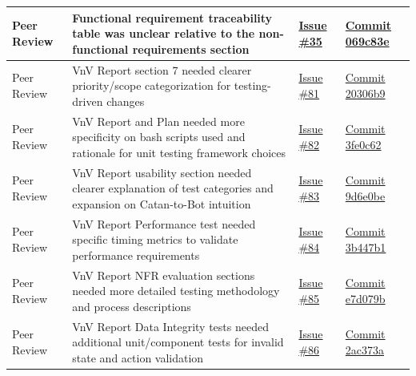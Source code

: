 \documentclass{article}
\begin{document}
\begin{landscape}
\begin{tabularx}{\linewidth}{|P{2.3cm}|Y|P{2.5cm}|P{3.5cm}|}
        \hline
        Peer Review &
        Functional requirement traceability table was unclear relative to the non-functional requirements section &
        \href{https://github.com/AlgoCatan/RLCatan/issues/35}{Issue \#35} &
        \href{https://github.com/AlgoCatan/RLCatan/commit/069c83ef1850ceb88d07440ca65f05e14de7216b}{Commit 069c83e} \\

        \hline
        Peer Review &
        VnV Report section 7 needed clearer priority/scope categorization for testing-driven changes &
        \href{https://github.com/AlgoCatan/RLCatan/issues/81}{Issue \#81} &
        \href{https://github.com/AlgoCatan/RLCatan/commit/20306b9df088b1c48930f2e38f7cfb656a0afc7b}{Commit 20306b9} \\

        \hline
        Peer Review &
        VnV Report and Plan needed more specificity on bash scripts used and rationale for unit testing framework choices &
        \href{https://github.com/AlgoCatan/RLCatan/issues/82}{Issue \#82} &
        \href{https://github.com/AlgoCatan/RLCatan/commit/3fe0c62a9cc5c39628fe42c1999d10716904911b}{Commit 3fe0c62} \\

        \hline
        Peer Review &
        VnV Report usability section needed clearer explanation of test categories and expansion on Catan-to-Bot intuition &
        \href{https://github.com/AlgoCatan/RLCatan/issues/83}{Issue \#83} &
        \href{https://github.com/AlgoCatan/RLCatan/commit/9d6e0be969beadc8aed7f09c2e0f439f7a3b094d}{Commit 9d6e0be} \\

        \hline
        Peer Review &
        VnV Report Performance test needed specific timing metrics to validate performance requirements &
        \href{https://github.com/AlgoCatan/RLCatan/issues/84}{Issue \#84} &
        \href{https://github.com/AlgoCatan/RLCatan/commit/3b447b1599b62d4f24cad65d1ad63126a9243473}{Commit 3b447b1} \\

        \hline
        Peer Review &
        VnV Report NFR evaluation sections needed more detailed testing methodology and process descriptions &
        \href{https://github.com/AlgoCatan/RLCatan/issues/85}{Issue \#85} &
        \href{https://github.com/AlgoCatan/RLCatan/commit/e7d079bb45b87278a19a4e9f3b7cd4f4b22afd91}{Commit e7d079b} \\

        \hline
        Peer Review &
        VnV Report Data Integrity tests needed additional unit/component tests for invalid state and action validation &
        \href{https://github.com/AlgoCatan/RLCatan/issues/86}{Issue \#86} &
        \href{https://github.com/AlgoCatan/RLCatan/commit/2ac373a4f7b5ae4aef476faa8db9c3906013a38c}{Commit 2ac373a} \\


\end{tabularx}
\end{landscape}
\end{document}
